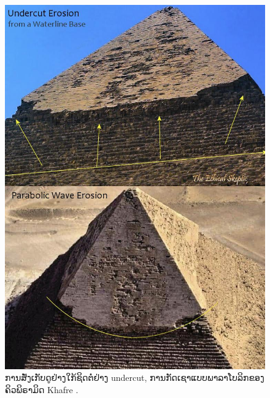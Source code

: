 \documentclass[10pt,twocolumn,letterpaper]{article}
\begin{document}
\begin{figure}[H]
\begin{center}
   \includegraphics[width=1\linewidth]{wave.jpg}
\end{center}
   \caption{ການສັ່ງເກັບດູຢ່າງໃກ້ຊິດຕໍ່ຢ່າງ undercut, ການກັດເຊາແບບພາລາໂບລິກຂອງຄິວພິຣາມິດ Khafre \cite{27}.}
\label{fig:19}
\label{fig:onecol}
\end{figure}
\end{document}
